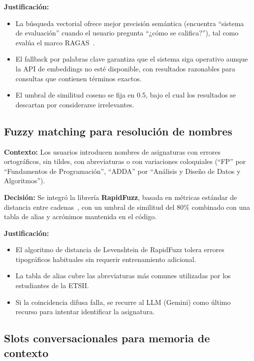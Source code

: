\textbf{Justificación:}
\begin{itemize}
    \item La búsqueda vectorial ofrece mejor precisión semántica (encuentra ``sistema de evaluación'' cuando el usuario pregunta ``¿cómo se califica?''), tal como evalúa el marco RAGAS~\cite{es2024ragas}.
    \item El fallback por palabras clave garantiza que el sistema siga operativo aunque la API de embeddings no esté disponible, con resultados razonables para consultas que contienen términos exactos.
    \item El umbral de similitud coseno se fija en 0.5, bajo el cual los resultados se descartan por considerarse irrelevantes.
\end{itemize}

\subsection{Fuzzy matching para resolución de nombres}\label{subsec:dd-fuzzy}

\textbf{Contexto:} Los usuarios introducen nombres de asignaturas con errores ortográficos, sin tildes, con abreviaturas o con variaciones coloquiales (``FP'' por ``Fundamentos de Programación'', ``ADDA'' por ``Análisis y Diseño de Datos y Algoritmos'').

\textbf{Decisión:} Se integró la librería \textbf{RapidFuzz}, basada en métricas estándar de distancia entre cadenas~\cite{cohen2003comparison}, con un umbral de similitud del 80\% combinado con una tabla de alias y acrónimos mantenida en el código.

\textbf{Justificación:}
\begin{itemize}
    \item El algoritmo de distancia de Levenshtein de RapidFuzz tolera errores tipográficos habituales sin requerir entrenamiento adicional.
    \item La tabla de alias cubre las abreviaturas más comunes utilizadas por los estudiantes de la ETSII.
    \item Si la coincidencia difusa falla, se recurre al LLM (Gemini) como último recurso para intentar identificar la asignatura.
\end{itemize}

\subsection{Slots conversacionales para memoria de contexto}\label{subsec:dd-slots}


